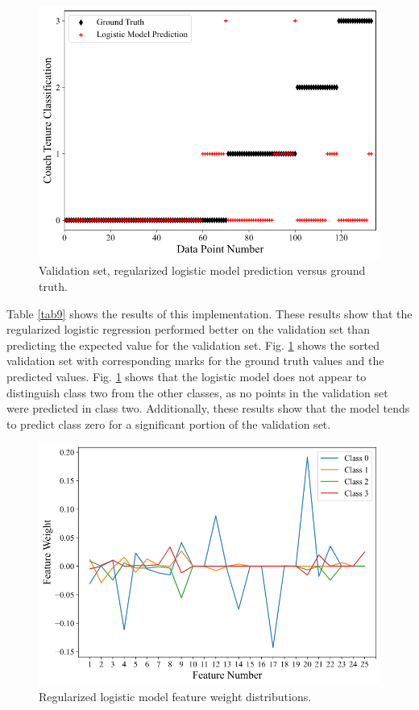 \documentclass[conference]{IEEEtran}
\begin{document}
\begin{figure}[htbp]
\centerline{\includegraphics[width=1\linewidth]{test4.png}}
\caption{Validation set, regularized logistic model prediction versus ground truth.}
\label{fig10}
\end{figure}

Table \ref{tab9} shows the results of this implementation. These results show that the regularized logistic regression performed  better on the validation set than predicting the expected value for the validation set. Fig. \ref{fig10} shows the sorted validation set with corresponding marks for the ground truth values and the predicted values. Fig. \ref{fig10} shows that the logistic model does not appear to distinguish class two from the other classes, as no points in the validation set were predicted in class two. Additionally, these results show that the model tends to predict class zero for a significant portion of the validation set. 

\begin{figure}[htbp]
\centerline{\includegraphics[width=1\linewidth]{weight4.png}}
\caption{Regularized logistic model feature weight distributions.}
\label{fig11}
\end{figure}
\end{document}
